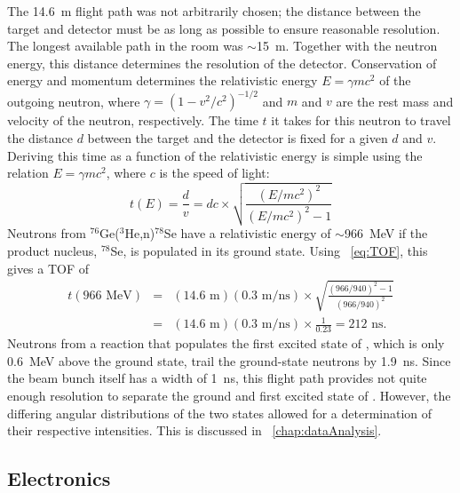 The 14.6~m flight path was not arbitrarily chosen; the distance between the target and detector must be as long as possible to ensure reasonable resolution.  The longest available path in the room was $\sim$15~m.  Together with the neutron energy, this distance determines the resolution of the detector.  Conservation of energy and momentum determines the relativistic energy $E = \gamma m c^2$ of the outgoing neutron, where $\gamma=(1-v^2/c^2)^{-1/2}$ and $m$ and $v$ are the rest mass and velocity of the neutron, respectively.  The time $t$ it takes for this neutron to travel the distance $d$ between the target and the detector is fixed for a given $d$ and $v$.  Deriving this time as a function of the relativistic energy is simple using the relation $E=\gamma mc^2$, where $c$ is the speed of light:
\begin{equation}
t(E) = \frac{d}{v} =  dc\times\sqrt{\frac{(E/mc^2)^2}{(E/mc^2)^2-1}} 
\label{eq:TOF}
\end{equation}
Neutrons from $^{76}$Ge($^3$He,n)$^{78}$Se have a relativistic energy of $\sim$966~MeV if the product nucleus, $^{78}$Se, is populated in its ground state.  Using {\eqn}~\ref{eq:TOF}, this gives a TOF of
\begin{eqnarray}
t(966 \text{ MeV}) &=& (14.6 \text{ m})(0.3 \text{ m/ns})\times\sqrt{\frac{(966/940)^2-1}{(966/940)^2}} \nonumber \\
           &=& (14.6 \text{ m})(0.3 \text{ m/ns})\times\frac{1}{0.23} = 212 \text{ ns} \nonumber.
\end{eqnarray}
Neutrons from a reaction that populates the first excited state of , which is only 0.6~MeV above the ground state, trail the ground-state neutrons by 1.9~ns.  Since the beam bunch itself has a width of 1~ns, this flight path provides not quite enough resolution to separate the ground and first excited state of \GeTargets. However, the differing angular distributions of the two states allowed for a determination of their respective intensities.  This is discussed in {\chap}~\ref{chap:dataAnalysis}.


\subsection{Electronics}
\label{sec:electronics}

